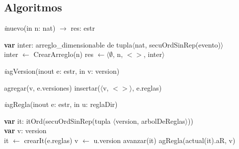 \subsection*{Algoritmos}

\incmargin{1em}
\linesnumbered
{}

\textit{i}nuevo(in n: nat) $\longrightarrow$ res: estr \\
\begin{algorithm}[H]
\BlankLine
\textbf{var} inter: arreglo\_dimensionable de tupla$\langle$nat, secuOrdSinRep(evento)$\rangle$ \\
\BlankLine
inter $\leftarrow$ CrearArreglo(n)
\BlankLine
{}
\BlankLine
res $\leftarrow \langle \emptyset$, n, $<>$, inter$\rangle$
\end{algorithm}

\vspace{11pt}

\textit{i}agVersion(inout e: estr, in v: version)\\
\begin{algorithm}[H]
\BlankLine
agregar(v, e.versiones)
insertar($\langle$v, $<>\rangle$, e.reglas)
\end{algorithm}

\vspace{11pt}

\textit{i}agRegla(inout e: estr, in u: reglaDir)\\
\begin{algorithm}[H]
\BlankLine
\textbf{var} it: itOrd(secuOrdSinRep(tupla $\langle$version, arbolDeReglas$\rangle$))\\
\textbf{var} v: version\\
\BlankLine
it $\leftarrow$ crearIt(e.reglas) 
v  $\leftarrow$ u.version 
\BlankLine
{}
{avanzar(it)}
agRegla(actual(it).aR, v) 
\end{algorithm}

\vspace{11pt}

